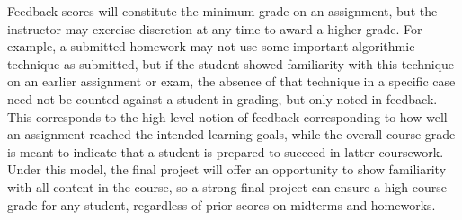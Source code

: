 \documentclass[11pt]{article}
\begin{document}
\noindent Feedback scores will constitute the minimum grade on an assignment, but the instructor
may exercise discretion at any time to award a higher grade. For example, a submitted homework
may not use some important algorithmic technique as submitted, but if the student showed familiarity
with this technique on an earlier assignment or exam, the absence of that technique in a specific
case need not be counted against a student in grading, but only noted in feedback. This corresponds to the high level notion of feedback corresponding to how well an assignment reached the intended learning goals, while the overall course grade is meant to indicate that a student is prepared to succeed in latter coursework. Under this model, the final project will offer an opportunity to show familiarity with all content in the course, so a strong final project can ensure a high course grade
for any student, regardless of prior scores on midterms and homeworks.


\end{document}
